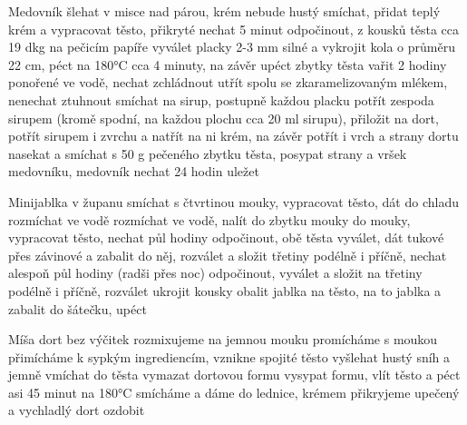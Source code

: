 \documentclass[12pt,a4paper]{article}
\begin{document}
\begin{recipe}{Medovník}
   šlehat v misce nad párou, krém nebude hustý
   smíchat, přidat teplý krém a vypracovat těsto, přikryté nechat 5 minut odpočinout, z kousků těsta cca 19 dkg na pečicím papíře vyválet placky 2-3 mm silné a vykrojit kola o průměru 22 cm, péct na 180°C cca 4 minuty, na závěr upéct zbytky těsta
   vařit 2 hodiny ponořené ve vodě, nechat zchládnout
   utřít spolu se zkaramelizovaným mlékem, nenechat ztuhnout
   smíchat na sirup, postupně každou placku potřít zespoda sirupem (kromě spodní, na každou plochu cca 20 ml sirupu), přiložit na dort, potřít sirupem i zvrchu a natřít na ni krém, na závěr potřít i vrch a strany dortu
   nasekat a smíchat s 50 g pečeného zbytku těsta, posypat strany a vršek medovníku, medovník nechat 24 hodin uležet
\end{recipe}
\newpage

\begin{recipe}{Minijablka v županu}
   smíchat s čtvrtinou mouky, vypracovat těsto, dát do chladu 
   rozmíchat ve vodě
   rozmíchat ve vodě, nalít do zbytku mouky
   do mouky, vypracovat těsto, nechat půl hodiny odpočinout, obě těsta vyválet, dát tukové přes
    závinové a zabalit do něj, rozválet a složit třetiny podélně i příčně, nechat alespoň půl hodiny (radši přes noc)
    odpočinout, vyválet a složit na třetiny podélně i příčně, rozválet
   ukrojit kousky
   obalit jablka
   na těsto, na to jablka a zabalit do šátečku, upéct
\end{recipe}
\newpage

\begin{recipe}{Míša dort bez výčitek}
   rozmixujeme na jemnou mouku
   promícháme s moukou
   přimícháme k sypkým ingrediencím, vznikne spojité těsto
   vyšlehat hustý sníh a jemně vmíchat do těsta
   vymazat dortovou formu
   vysypat formu, vlít těsto a péct asi 45 minut na 180°C
   smícháme a dáme do lednice, krémem přikryjeme upečený a vychladlý dort
   ozdobit
\end{recipe}
\newpage
\end{document}
